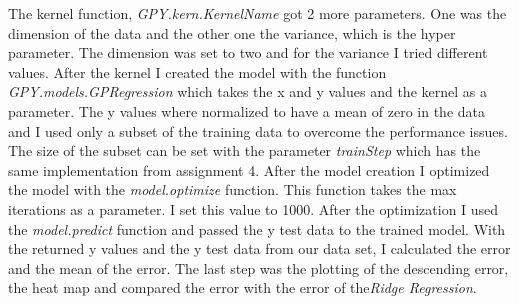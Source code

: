 \documentclass[10pt, a4paper, twocolumn]{article} %
\begin{document}
The kernel function, \textit{GPY.kern.KernelName} got 2 more parameters. One was the dimension of the data and the other one the variance, which is the hyper parameter. The dimension was set to two and for the variance I tried different values. After the kernel I created the model with the function \textit{GPY.models.GPRegression} which takes the x and y values and the kernel as a parameter. The y values where normalized to have a mean of zero in the data and I used only a subset of the training data to overcome the performance issues. The size of the subset can be set with the parameter \textit{trainStep} which has the same implementation from assignment 4. After the model creation I optimized the model with the \textit{model.optimize} function. This function takes the max iterations as a parameter. I set this value to 1000. After the optimization I used the \textit{model.predict} function and passed the y test data to the trained model. With the returned y values and the y test data from our data set, I calculated the error and the mean of the error. The last step was the plotting of the descending error, the heat map and compared the error with the error of the\textit{Ridge Regression}.
\end{document}

